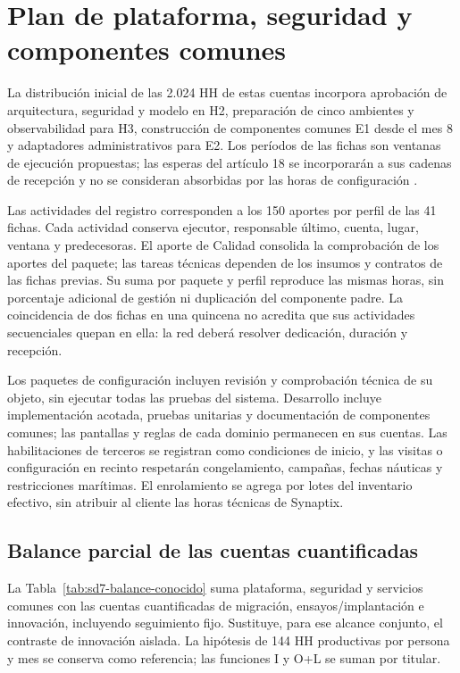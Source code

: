 \section{Plan de plataforma, seguridad y componentes comunes}
La distribución inicial de las 2.024 HH de estas cuentas incorpora aprobación de arquitectura, seguridad y modelo en H2, preparación de cinco ambientes y observabilidad para H3, construcción de componentes comunes E1 desde el mes 8 y adaptadores administrativos para E2. Los períodos de las fichas son ventanas de ejecución propuestas; las esperas del artículo 18 se incorporarán a sus cadenas de recepción y no se consideran absorbidas por las horas de configuración \parencite[arts.~17--18; Formulario~E-25; pp.~12--74]{bases-admin}.

Las actividades del registro  corresponden a los 150 aportes por perfil de las 41 fichas. Cada actividad conserva ejecutor, responsable último, cuenta, lugar, ventana y predecesoras. El aporte de Calidad consolida la comprobación de los aportes del paquete; las tareas técnicas dependen de los insumos y contratos de las fichas previas. Su suma por paquete y perfil reproduce las mismas horas, sin porcentaje adicional de gestión ni duplicación del componente padre. La coincidencia de dos fichas en una quincena no acredita que sus actividades secuenciales quepan en ella: la red deberá resolver dedicación, duración y recepción.

Los paquetes de configuración incluyen revisión y comprobación técnica de su objeto, sin ejecutar todas las pruebas del sistema. Desarrollo incluye implementación acotada, pruebas unitarias y documentación de componentes comunes; las pantallas y reglas de cada dominio permanecen en sus cuentas. Las habilitaciones de terceros se registran como condiciones de inicio, y las visitas o configuración en recinto respetarán congelamiento, campañas, fechas náuticas y restricciones marítimas. El enrolamiento se agrega por lotes del inventario efectivo, sin atribuir al cliente las horas técnicas de Synaptix.



\subsection{Balance parcial de las cuentas cuantificadas}
La Tabla~\ref{tab:sd7-balance-conocido} suma plataforma, seguridad y servicios comunes con las cuentas cuantificadas de migración, ensayos/implantación e innovación, incluyendo seguimiento fijo. Sustituye, para ese alcance conjunto, el contraste de innovación aislada. La hipótesis de 144 HH productivas por persona y mes se conserva como referencia; las funciones I y O+L se suman por titular.



